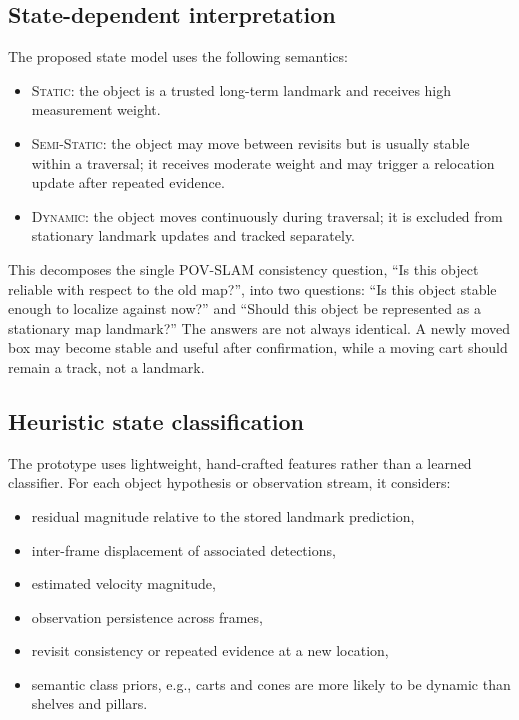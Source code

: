 ﻿\documentclass[11pt]{article}
\newcommand{\Static}{\textsc{Static}}
\newcommand{\SemiStatic}{\textsc{Semi-Static}}
\newcommand{\Dynamic}{\textsc{Dynamic}}
\begin{document}
\subsection{State-dependent interpretation}
The proposed state model uses the following semantics:
\begin{itemize}[leftmargin=*]
    \item \Static: the object is a trusted long-term landmark and receives high measurement weight.
    \item \SemiStatic: the object may move between revisits but is usually stable within a traversal; it receives moderate weight and may trigger a relocation update after repeated evidence.
    \item \Dynamic: the object moves continuously during traversal; it is excluded from stationary landmark updates and tracked separately.
\end{itemize}

This decomposes the single POV-SLAM consistency question, ``Is this object reliable with respect to the old map?'', into two questions: ``Is this object stable enough to localize against now?'' and ``Should this object be represented as a stationary map landmark?'' The answers are not always identical. A newly moved box may become stable and useful after confirmation, while a moving cart should remain a track, not a landmark.

\subsection{Heuristic state classification}
The prototype uses lightweight, hand-crafted features rather than a learned classifier. For each object hypothesis or observation stream, it considers:
\begin{itemize}[leftmargin=*]
    \item residual magnitude relative to the stored landmark prediction,
    \item inter-frame displacement of associated detections,
    \item estimated velocity magnitude,
    \item observation persistence across frames,
    \item revisit consistency or repeated evidence at a new location,
    \item semantic class priors, e.g., carts and cones are more likely to be dynamic than shelves and pillars.
\end{itemize}
\end{document}
